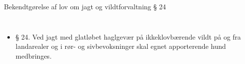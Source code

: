 \begin{frame}{Bekendtgørelse af lov om jagt og vildtforvaltning § 24} %
\vspace{1em}
\begin{columns}[c] %
\small
\raggedright
\begin{itemize}
\itemsep0.6em %
\item § 24. Ved jagt med glatløbet haglgevær på ikkeklovbærende vildt på og fra landarealer og i rør- og sivbevoksninger skal egnet apporterende hund medbringes.
\end{itemize}
\centering
\vspace{0pt}
\end{columns}
\end{frame}